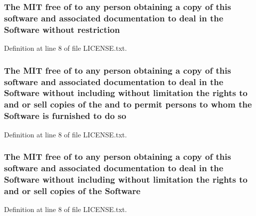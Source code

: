 \subsubsection[{\texorpdfstring{restriction}{restriction}}]{\setlength{\rightskip}{0pt plus 5cm}The M\+IT free of to any person obtaining a {\bf copy} of this software and associated documentation to deal in the {\bf Software} without restriction}\hypertarget{LICENSE_8txt_ac0e1e4a858a6a19c5392f7f6d29f969c}{}\label{LICENSE_8txt_ac0e1e4a858a6a19c5392f7f6d29f969c}


Definition at line 8 of file L\+I\+C\+E\+N\+S\+E.\+txt.

\subsubsection[{\texorpdfstring{so}{so}}]{\setlength{\rightskip}{0pt plus 5cm}The M\+IT free of to any person obtaining a {\bf copy} of this software and associated documentation to deal in the {\bf Software} without including without limitation the rights to and or sell copies of the and to permit persons to whom the {\bf Software} is furnished to do so}\hypertarget{LICENSE_8txt_ab05c0f0392781fce452b91e1ede41d90}{}\label{LICENSE_8txt_ab05c0f0392781fce452b91e1ede41d90}


Definition at line 8 of file L\+I\+C\+E\+N\+S\+E.\+txt.

\subsubsection[{\texorpdfstring{Software}{Software}}]{\setlength{\rightskip}{0pt plus 5cm}The M\+IT free of to any person obtaining a {\bf copy} of this software and associated documentation to deal in the Software without including without limitation the rights to and or sell copies of the Software}\hypertarget{LICENSE_8txt_a22a1529885b3e9d66b0c72fe604fc3dc}{}\label{LICENSE_8txt_a22a1529885b3e9d66b0c72fe604fc3dc}


Definition at line 8 of file L\+I\+C\+E\+N\+S\+E.\+txt.

